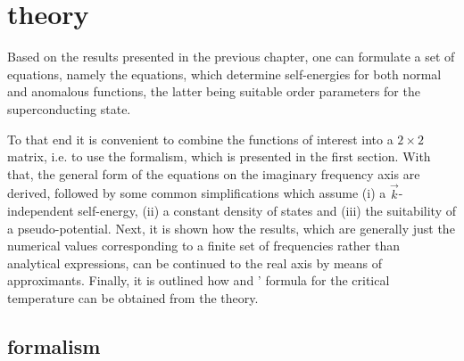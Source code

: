 
\chapter{ theory}

Based on the results presented in the previous chapter, one can formulate a set
of equations, namely the  equations, which determine
self-energies for both normal and anomalous  functions, the latter
being suitable order parameters for the superconducting state.

To that end it is convenient to combine the  functions of interest
into a $2 \times 2$ matrix, i.e. to use the  formalism, which is
presented in the first section. With that, the general form of the
 equations on the imaginary frequency axis are derived,
followed by some common simplifications which assume (i) a $\vec k$-independent
self-energy, (ii) a constant density of states and (iii) the suitability of a
 pseudo-potential. Next, it is shown how the results, which are
generally just the numerical values corresponding to a finite set of
 frequencies rather than analytical expressions, can be
continued to the real axis by means of  approximants. Finally, it is
outlined how  and ' formula for the critical
temperature can be obtained from the  theory.

\section{ formalism}

